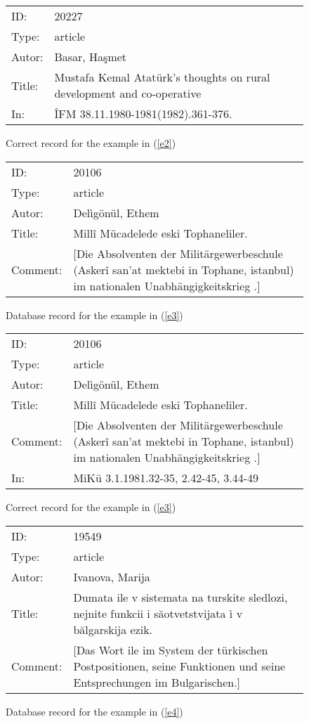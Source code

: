 \documentclass{scrartcl}
\begin{document}
\begin{figure}[ht]
\begin{tabular}{|p{}p{}|}
ID:  	&20227\\
Type: 	&article\\
Autor: 	&Basar, Haşmet\\
Title: 	&Mustafa Kemal Atatürk's thoughts on rural development and
co-operative\\
In: 	&ÎFM 38.11.1980-1981(1982).361-376.
\end{tabular}
\caption{Correct record for the example in (\ref{e2}) \label{e2:f2}}
\end{figure}

\begin{figure}[ht]
\begin{tabular}{|p{}p{}|}
ID:  	&20106 \\
Type: 	&article \\
Autor: 	&Delìgönül, Ethem \\
Title: 	&Millî Mücadelede eski Tophaneliler.	\\
Comment: 	&$[$Die Absolventen der Militärgewerbeschule (Askerî san'at mektebi in
Tophane, istanbul) im nationalen Unabhängigkeitskrieg .$]$ 
\end{tabular}
\caption{Database record for the example in (\ref{e3}) \label{e3:f1}}
\end{figure} 

\begin{figure}[ht]
\begin{tabular}{|p{}p{}|}
ID:  	&20106 \\
Type: 	&article \\
Autor: 	&Delìgönül, Ethem \\
Title: 	&Millî Mücadelede eski Tophaneliler.	\\ 
Comment: 	&$[$Die Absolventen der Militärgewerbeschule (Askerî san'at mektebi in
Tophane, istanbul) im nationalen Unabhängigkeitskrieg .$]$  \\ 
In: &MiKü 3.1.1981.32-35, 2.42-45, 3.44-49
\end{tabular}
\caption{Correct record for the example in (\ref{e3}) \label{e3:f2}}
\end{figure}

\begin{figure}[ht]
\begin{tabular}{|p{}p{}|}
ID:  	&19549 \\
Type: 	&article \\
Autor: 	&Ivanova, Marija \\
Title: 	&Dumata ile v sistemata na turskite sledlozi, nejnite funkcii i
săotvetstvijata ì v bălgarskija ezik.  \\
Comment:& 	$[$Das Wort ile im System der türkischen Postpositionen, seine
Funktionen und seine Entsprechungen im Bulgarischen.$]$
\end{tabular}
\caption{Database record for the example in (\ref{e4}) \label{e4:f1}}
\end{figure} 
\end{document}
